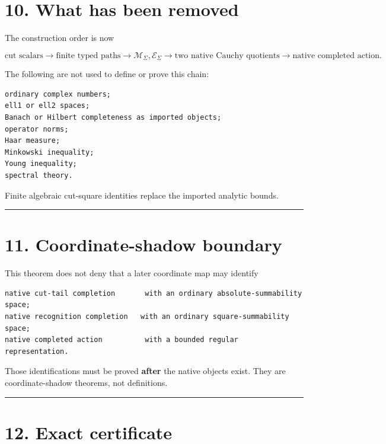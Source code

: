 \hypertarget{what-has-been-removed}{%
\section{10. What has been removed}\label{what-has-been-removed}}

The construction order is now

\[
\boxed{
\text{cut scalars}
\to
\text{finite typed paths}
\to
\mathcal M_\Sigma,\mathcal E_\Sigma
\to
\text{two native Cauchy quotients}
\to
\text{native completed action}.
}
\]

The following are not used to define or prove this chain:

\begin{verbatim}
ordinary complex numbers;
ell1 or ell2 spaces;
Banach or Hilbert completeness as imported objects;
operator norms;
Haar measure;
Minkowski inequality;
Young inequality;
spectral theory.
\end{verbatim}

Finite algebraic cut-square identities replace the imported analytic bounds.

\begin{center}\rule{0.5\linewidth}{0.5pt}\end{center}

\hypertarget{coordinate-shadow-boundary}{%
\section{11. Coordinate-shadow boundary}\label{coordinate-shadow-boundary}}

This theorem does not deny that a later coordinate map may identify

\begin{verbatim}
native cut-tail completion       with an ordinary absolute-summability space;
native recognition completion   with an ordinary square-summability space;
native completed action          with a bounded regular representation.
\end{verbatim}

Those identifications must be proved \textbf{after} the native objects exist. They
are coordinate-shadow theorems, not definitions.

\begin{center}\rule{0.5\linewidth}{0.5pt}\end{center}

\hypertarget{exact-certificate}{%
\section{12. Exact certificate}\label{exact-certificate}}

